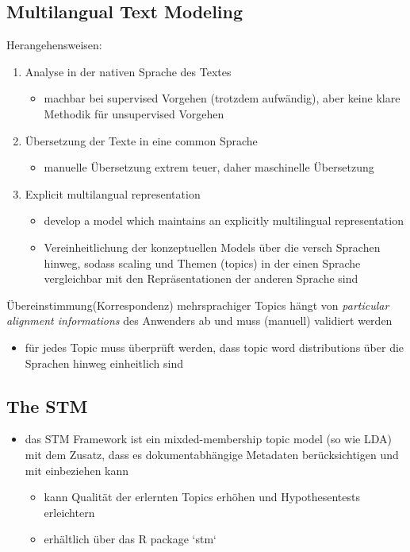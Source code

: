 \documentclass[11pt]{article}
\begin{document}
\subsection{Multilangual Text Modeling}
\label{sec:org0491978}
Herangehensweisen:
\begin{enumerate}
\item Analyse in der nativen Sprache des Textes
\begin{itemize}
\item machbar bei supervised Vorgehen (trotzdem aufwändig), aber keine klare Methodik für unsupervised Vorgehen
\end{itemize}
\item Übersetzung der Texte in eine common Sprache
\begin{itemize}
\item manuelle Übersetzung extrem teuer, daher maschinelle Übersetzung
\end{itemize}
\item Explicit multilangual representation
\begin{itemize}
\item develop a model which maintains an explicitly multilingual representation
\item Vereinheitlichung der konzeptuellen Models über die versch Sprachen hinweg, sodass scaling und Themen (topics) in der einen Sprache vergleichbar mit den Repräsentationen der anderen Sprache sind
\end{itemize}
\end{enumerate}

Übereinstimmung(Korrespondenz) mehrsprachiger Topics hängt von \emph{particular alignment informations} des Anwenders ab und muss (manuell) validiert werden
\begin{itemize}
\item für jedes Topic muss überprüft werden, dass topic word distributions über die Sprachen hinweg einheitlich sind
\end{itemize}
\subsection{The STM}
\label{sec:orgf72c7f9}
\begin{itemize}
\item das STM Framework ist ein mixded-membership topic model (so wie LDA) mit dem Zusatz, dass es dokumentabhängige Metadaten berücksichtigen und mit einbeziehen kann
\begin{itemize}
\item kann Qualität der erlernten Topics erhöhen und Hypothesentests erleichtern
\item erhältlich über das R package `stm`
\end{itemize}
\end{itemize}
\end{document}
